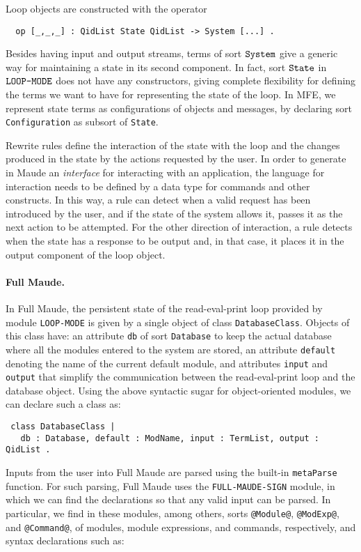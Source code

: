 Loop objects are constructed with the operator 
\begin{verbatim}
  op [_,_,_] : QidList State QidList -> System [...] .
\end{verbatim}
Besides having input and output streams,
terms of sort $\text{\tt System}$ give a generic way for maintaining a state
in its second component. In fact, sort $\text{\tt State}$ in
$\text{\tt LOOP-MODE}$ does not have any constructors, giving complete
flexibility for defining the terms we want to have for representing
the state of the loop. In MFE, we represent state terms as
configurations of objects and messages, by declaring sort {\tt Configuration}
as subsort of {\tt State}.

Rewrite rules define the interaction of the state with the loop
and the changes produced in the state by the actions requested by the user.
In order to generate in Maude an {\em interface} for interacting with an application,
the language for interaction needs to be defined by a data type for commands and other constructs.
In this way, a rule can detect when a valid request has been introduced
by the user, and if the state of the system allows it, passes it as the next
action to be attempted. For the other direction of interaction, a rule
detects when the state has a response to be output and, in that case, 
it places it in the output component of the loop object.

\paragraph{\bf Full Maude.}
In Full Maude, the persistent state of the read-eval-print loop
 provided by module
\texttt{LOOP-MODE} is given by a single object of class 
\texttt{DatabaseClass}. 
%
Objects of this class have: an attribute \texttt{db} of sort 
\texttt{Database} to keep the actual database where all the
modules entered to the system are stored,
an attribute \texttt{default} denoting the name of the current 
default module, and attributes \texttt{input} and \texttt{output}
that simplify the communication between the read-eval-print loop 
and the database object. 
%
Using the above syntactic sugar for object-oriented modules, 
we can declare such a class as:

\begin{small}
\begin{verbatim}
 class DatabaseClass | 
   db : Database, default : ModName, input : TermList, output : QidList .
\end{verbatim}
\end{small}
%
Inputs from the user into Full Maude are parsed using the built-in \texttt{metaParse} function. For such parsing, Full Maude uses
the \texttt{FULL-MAUDE-SIGN} module, in which we can find the 
declarations so that any valid input can be parsed. 
In particular, we find in these modules, among others, sorts 
\verb~@Module@~, 
\verb~@ModExp@~, 
and \verb~@Command@~, of modules, 
module expressions, and commands, respectively,
and syntax declarations such as:


